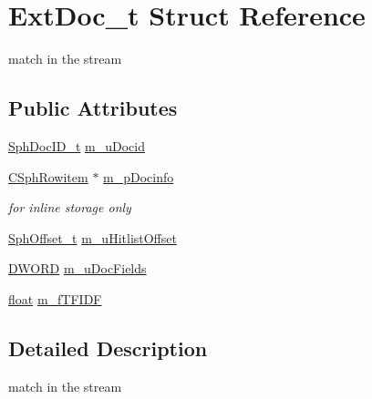 \hypertarget{structExtDoc__t}{\section{Ext\-Doc\-\_\-t Struct Reference}
\label{structExtDoc__t}
}


match in the stream  


\subsection*{Public Attributes}
\begin{DoxyCompactItemize}
\item 
\hyperlink{sphinx_8h_a3176771631c12a9e4897272003e6b447}{Sph\-Doc\-I\-D\-\_\-t} \hyperlink{structExtDoc__t_a069be250ee7f6b3c8c7444d5e0f6131f}{m\-\_\-u\-Docid}
\item 
\hyperlink{sphinx_8h_a6a2df0f05f3397df8b6e230fda6f852f}{C\-Sph\-Rowitem} $\ast$ \hyperlink{structExtDoc__t_ad24d315e3e0396613fe4a7b538cd03b0}{m\-\_\-p\-Docinfo}
\begin{DoxyCompactList}\small\item\em for inline storage only \end{DoxyCompactList}\item 
\hyperlink{sphinx_8h_a0fb3b64afebef33c61367714754eaa90}{Sph\-Offset\-\_\-t} \hyperlink{structExtDoc__t_a4306341b6dcc6bf4e9ae8f9db211723b}{m\-\_\-u\-Hitlist\-Offset}
\item 
\hyperlink{sphinxstd_8h_a798af1e30bc65f319c1a246cecf59e39}{D\-W\-O\-R\-D} \hyperlink{structExtDoc__t_a60f8d0e41e4f1ee13391ac1ccd725356}{m\-\_\-u\-Doc\-Fields}
\item 
\hyperlink{sphinxexpr_8cpp_a0e0d0739f7035f18f949c2db2c6759ec}{float} \hyperlink{structExtDoc__t_ace1dc0e60d48c5bfcaecfdb8107aa7d9}{m\-\_\-f\-T\-F\-I\-D\-F}
\end{DoxyCompactItemize}


\subsection{Detailed Description}
match in the stream 

